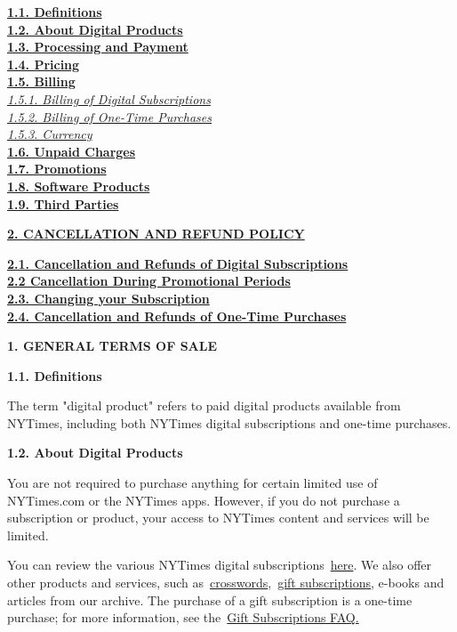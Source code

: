 \protect\hyperlink{definition}{\textbf{1.1. Definitions}}\\
\protect\hyperlink{aboutdigi}{\textbf{1.2. About Digital Products}}\\
\protect\hyperlink{processing}{\textbf{1.3. Processing and Payment}}\\
\protect\hyperlink{pricing}{\textbf{1.4. Pricing}}\\
\protect\hyperlink{billing}{\textbf{1.5. Billing}}\\
\protect\hyperlink{billingdigi}{\emph{1.5.1. Billing of Digital
Subscriptions}}\\
\protect\hyperlink{billingone}{\emph{1.5.2. Billing of One-Time
Purchases}}\\
\protect\hyperlink{currency}{\emph{1.5.3. Currency}}\\
\protect\hyperlink{unpaid}{\textbf{1.6. Unpaid Charges}}\\
\protect\hyperlink{promotion}{\textbf{1.7. Promotions}}\\
\protect\hyperlink{software}{\textbf{1.8. Software Products}}\\
\protect\hyperlink{thirdparty}{\textbf{1.9. Third Parties}}

\protect\hyperlink{cancellation}{\textbf{2. CANCELLATION AND REFUND
POLICY}}

\protect\hyperlink{canceldigi}{\textbf{2.1. Cancellation and Refunds of
Digital Subscriptions}}\\
\protect\hyperlink{cancelpromo}{\textbf{2.2 Cancellation During
Promotional Periods}}\\
\protect\hyperlink{changesub}{\textbf{2.3. Changing your
Subscription}}\\
\protect\hyperlink{cancelone}{\textbf{2.4. Cancellation and Refunds of
One-Time Purchases}}

\textbf{1. GENERAL TERMS OF SALE}

\textbf{1.1. Definitions}

The term "digital product" refers to paid digital products available
from NYTimes, including both NYTimes digital subscriptions and one-time
purchases.

\textbf{1.2. About Digital Products}

You are not required to purchase anything for certain limited use of
NYTimes.com or the NYTimes apps. However, if you do not purchase a
subscription or product, your access to NYTimes content and services
will be limited.

You can review the various NYTimes digital
subscriptions~\href{http://www.nytimes3xbfgragh.onion/subscriptions/Multiproduct/lp87JHJ.html?campaignId=466K8}{here}.
We also offer other products and services, such
as~\href{http://www.nytimes3xbfgragh.onion/pages/crosswords/index.html}{crosswords},~\href{http://www.nytimes3xbfgragh.onion/subscriptions/Multiproduct/lp4021.html?campaignId=393LW}{gift
subscriptions}, e-books and articles from our archive. The purchase of a
gift subscription is a one-time purchase; for more information, see
the~\href{https://help.nytimes3xbfgragh.onion/hc/en-us/articles/115015919807-Gift-subscriptions}{Gift
Subscriptions FAQ.}

